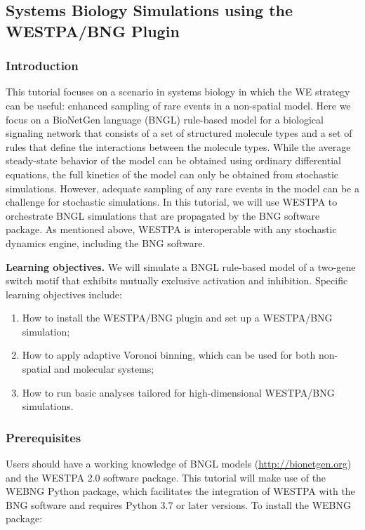 \subsection{Systems Biology Simulations using the WESTPA/BNG Plugin}

\subsubsection{Introduction}
This tutorial focuses on a scenario in systems biology in which the WE strategy can be useful: enhanced sampling of rare events in a non-spatial model. 
Here we focus on a BioNetGen language (BNGL) rule-based model for a biological signaling network that consists of a set of structured molecule types and a set of rules that define the interactions between the molecule types. 
While the average steady-state behavior of the model can be obtained using ordinary differential equations, the full kinetics of the model can only be obtained from stochastic simulations. 
However, adequate sampling of any rare events in the model can be a challenge for stochastic simulations. 
In this tutorial, we will use WESTPA to orchestrate BNGL simulations that are propagated by the BNG software package. 
As mentioned above, WESTPA is interoperable with any stochastic dynamics engine, including the BNG software.

\textbf{Learning objectives.} We will simulate a BNGL rule-based model of a two-gene switch motif that exhibits mutually exclusive activation and inhibition.
Specific learning objectives include:
\begin{enumerate}
    \item How to install the WESTPA/BNG plugin and set up a WESTPA/BNG simulation; 
    \item How to apply adaptive Voronoi binning, which can be used for both non-spatial and molecular systems; 
    \item How to run basic analyses tailored for high-dimensional WESTPA/BNG simulations.
\end{enumerate} \linebreak

\subsubsection{Prerequisites}
Users should have a working knowledge of BNGL models ({\url{http://bionetgen.org}}) and the WESTPA 2.0 software package. 
This tutorial will make use of the WEBNG Python package, which facilitates the integration of WESTPA with the BNG software and requires Python 3.7 or later versions. 
To install the WEBNG package: 

